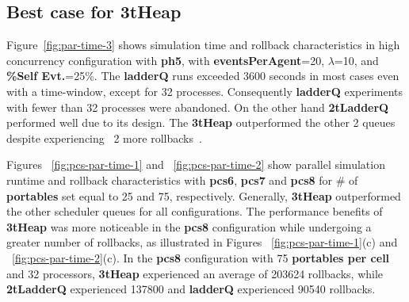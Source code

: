 \subsection{Best case for 3tHeap}

Figure~\ref{fig:par-time-3} shows simulation time and rollback characteristics in high concurrency configuration with \textbf{ph5}, with
\textbf{eventsPerAgent}=20, $\lambda$=10, and \textbf{\%Self Evt.}=25\%. The \textbf{ladderQ} runs exceeded 3600 seconds in most cases even with a time-window, except for 32 processes. Consequently \textbf{ladderQ} experiments with fewer than 32 processes were abandoned. On the other
hand \textbf{2tLadderQ} performed well due to its design. The \textbf{3tHeap} outperformed the other 2 queues despite experiencing ~2\texttimes\/
more rollbacks~\cite{higiro2017multi}.

Figures ~\ref{fig:pcs-par-time-1} and ~\ref{fig:pcs-par-time-2} show parallel simulation runtime and rollback characteristics with \textbf{pcs6}, \textbf{pcs7} and \textbf{pcs8} for \# of \textbf{portables} set equal to 25 and 75, respectively. Generally, \textbf{3tHeap} outperformed the other scheduler queues for all configurations. The performance benefits of \textbf{3tHeap} was more noticeable in the \textbf{pcs8} configuration while undergoing a greater number of rollbacks, as illustrated in Figures ~\ref{fig:pcs-par-time-1}(c) and ~\ref{fig:pcs-par-time-2}(c). In the \textbf{pcs8} configuration with 75 \textbf{portables per cell} and 32 processors, \textbf{3tHeap} experienced an average of 203624 rollbacks, while \textbf{2tLadderQ} experienced 137800 and \textbf{ladderQ} experienced 90540 rollbacks. 


